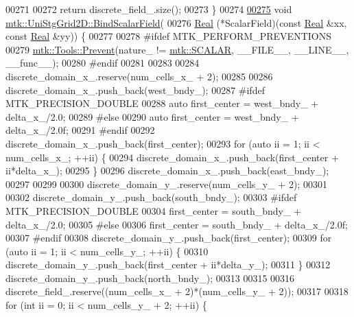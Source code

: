 \begin{DoxyCode}
00271 
00272   \textcolor{keywordflow}{return} discrete\_field\_.size();
00273 \}
00274 
\hypertarget{mtk__uni__stg__grid__2d_8cc_source_l00275}{}\hyperlink{classmtk_1_1UniStgGrid2D_a5f9910ffb94e0314b16c026c4b5762ee}{00275} \textcolor{keywordtype}{void} \hyperlink{classmtk_1_1UniStgGrid2D_a5f9910ffb94e0314b16c026c4b5762ee}{mtk::UniStgGrid2D::BindScalarField}(
00276     \hyperlink{group__c01-roots_gac080bbbf5cbb5502c9f00405f894857d}{Real} (*ScalarField)(\textcolor{keyword}{const} \hyperlink{group__c01-roots_gac080bbbf5cbb5502c9f00405f894857d}{Real} &xx, \textcolor{keyword}{const} \hyperlink{group__c01-roots_gac080bbbf5cbb5502c9f00405f894857d}{Real} &yy)) \{
00277 
00278 \textcolor{preprocessor}{  #ifdef MTK\_PERFORM\_PREVENTIONS}
00279   \hyperlink{classmtk_1_1Tools_a332324c6f25e66be9dff48c5987a3b9f}{mtk::Tools::Prevent}(nature\_ != \hyperlink{namespacemtk_ga4c54f2a329cfb4e56213b02a259d19e2af481d45bd70d41381c7d72e200889205}{mtk::SCALAR}, \_\_FILE\_\_, \_\_LINE\_\_, \_\_func\_\_);
00280 \textcolor{preprocessor}{  #endif}
00281 
00283 
00284   discrete\_domain\_x\_.reserve(num\_cells\_x\_ + 2);
00285 
00286   discrete\_domain\_x\_.push\_back(west\_bndy\_);
00287 \textcolor{preprocessor}{  #ifdef MTK\_PRECISION\_DOUBLE}
00288   \textcolor{keyword}{auto} first\_center = west\_bndy\_ + delta\_x\_/2.0;
00289 \textcolor{preprocessor}{  #else}
00290   \textcolor{keyword}{auto} first\_center = west\_bndy\_ + delta\_x\_/2.0f;
00291 \textcolor{preprocessor}{  #endif}
00292   discrete\_domain\_x\_.push\_back(first\_center);
00293   \textcolor{keywordflow}{for} (\textcolor{keyword}{auto} ii = 1; ii < num\_cells\_x\_; ++ii) \{
00294     discrete\_domain\_x\_.push\_back(first\_center + ii*delta\_x\_);
00295   \}
00296   discrete\_domain\_x\_.push\_back(east\_bndy\_);
00297 
00299 
00300   discrete\_domain\_y\_.reserve(num\_cells\_y\_ + 2);
00301 
00302   discrete\_domain\_y\_.push\_back(south\_bndy\_);
00303 \textcolor{preprocessor}{  #ifdef MTK\_PRECISION\_DOUBLE}
00304   first\_center = south\_bndy\_ + delta\_x\_/2.0;
00305 \textcolor{preprocessor}{  #else}
00306   first\_center = south\_bndy\_ + delta\_x\_/2.0f;
00307 \textcolor{preprocessor}{  #endif}
00308   discrete\_domain\_y\_.push\_back(first\_center);
00309   \textcolor{keywordflow}{for} (\textcolor{keyword}{auto} ii = 1; ii < num\_cells\_y\_; ++ii) \{
00310     discrete\_domain\_y\_.push\_back(first\_center + ii*delta\_y\_);
00311   \}
00312   discrete\_domain\_y\_.push\_back(north\_bndy\_);
00313 
00315 
00316   discrete\_field\_.reserve((num\_cells\_x\_ + 2)*(num\_cells\_y\_ + 2));
00317 
00318   \textcolor{keywordflow}{for} (\textcolor{keywordtype}{int} ii = 0; ii < num\_cells\_y\_ + 2; ++ii) \{

\end{DoxyCode}
